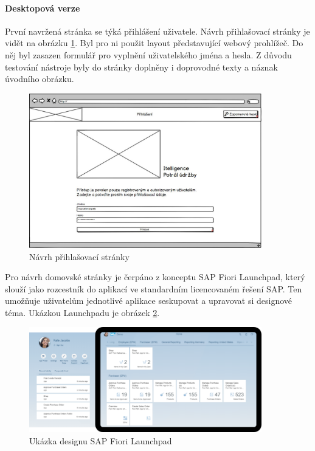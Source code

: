 \documentclass[thesis=M,czech]{FITthesis}[2012/06/26]
\begin{document}
\paragraph{Desktopová verze}
První navržená stránka se týká přihlášení uživatele. Návrh přihlašovací stránky je vidět na obrázku \ref{img:bal_login_desktop}. Byl pro ni použit layout představující webový prohlížeč. Do něj byl zasazen formulář pro vyplnění uživatelského jména a hesla. Z důvodu testování nástroje byly do stránky doplněny i doprovodné texty a náznak úvodního obrázku. 
\begin{figure}[H]
	\centering
	\includegraphics[width=0.9\textwidth]{images/bal_login}
	\caption{Návrh přihlašovací stránky}
	\label{img:bal_login_desktop}
\end{figure}
Pro návrh domovské stránky je čerpáno z konceptu SAP Fiori Launchpad, který slouží jako rozcestník do aplikací ve standardním licencovaném řešení SAP. Ten umožňuje uživatelům jednotlivé aplikace seskupovat a upravovat si designové téma. Ukázkou Launchpadu je obrázek \ref{img:fiori_launchpad}. 
\begin{figure}[H]
	\centering
	\includegraphics[width=0.9\textwidth]{images/fiori_launchpad}
	\caption{Ukázka designu SAP Fiori Launchpad}
	\label{img:fiori_launchpad}
\end{figure}
\end{document}
